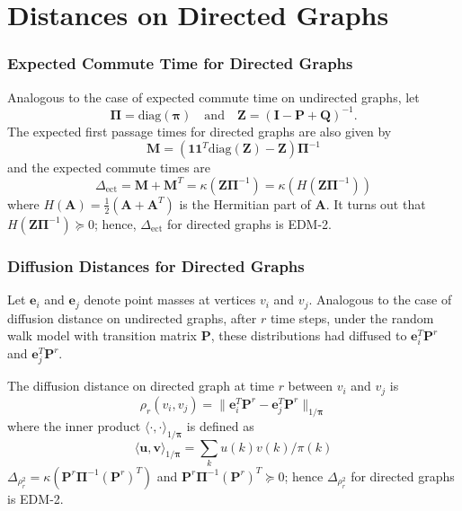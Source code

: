 \documentclass[professionalfonts, hyperref={pdfpagelabels=false,
  colorlinks=true, linkcolor=purple}]{beamer}
\begin{document}
\section{Distances on Directed Graphs}
\begin{frame}
  \frametitle{Expected Commute Time for Directed Graphs}
  Analogous to the case of expected commute time on undirected graphs,
  let 
  \begin{equation*}
    \bm{\Pi} = \mathrm{diag}(\bm{\pi}) \quad \text{and} \quad
    \mathbf{Z} = (\mathbf{I} - \mathbf{P} + \mathbf{Q})^{-1}.
  \end{equation*}
  The expected first passage times for directed graphs are also given by
  \begin{equation*}
    \mathbf{M} = (\mathbf{1}\mathbf{1}^{T}\mathrm{diag}(\mathbf{Z}) -
    \mathbf{Z})\bm{\Pi}^{-1} 
  \end{equation*}
  and the expected commute times are
  \begin{equation*}
    \Delta_{\mathrm{ect}} = \mathbf{M} + \mathbf{M}^{T} =
    \kappa(\mathbf{Z}\bm{\Pi}^{-1}) =
    \kappa(H(\mathbf{Z}\bm{\Pi}^{-1}))
  \end{equation*}
  where $H(\mathbf{A}) = \tfrac{1}{2}(\mathbf{A} + \mathbf{A}^{T})$ is
  the Hermitian part of $\mathbf{A}$.
  \vskip10pt
  It turns out that $H(\mathbf{Z}\bm{\Pi}^{-1}) \succeq 0$; hence,
  \vskip10pt \alert{$\Delta_{\mathrm{ect}}$ for directed graphs is
    EDM-2.}
\end{frame}

\begin{frame}
  \frametitle{Diffusion Distances for Directed Graphs}
  Let $\bm{e}_i$ and $\bm{e}_j$ denote point masses at vertices $v_i$ and
  $v_j$. Analogous to the case of diffusion distance on undirected
  graphs, after $r$ time steps, under the random walk model with
  transition matrix $\mathbf{P}$, these distributions had diffused to
  $\bm{e}_i^{T} \mathbf{P}^{r}$ and $\bm{e}_j^{T}\mathbf{P}^{r}$. 
  
  \vskip10pt 
  The diffusion distance on directed graph at
  time $r$ between $v_i$ and $v_j$ is
  \begin{equation*}
    \rho_{r}(v_i,v_j) = \| \bm{e}_i^{T} \mathbf{P}^{r} -
    \bm{e}_j^{T}
    \mathbf{P}^{r} \|_{1/\bm{\pi}}
  \end{equation*}
  where the inner product $\langle \cdot, \cdot
  \rangle_{1/\bm{\pi}}$ is defined as
  \begin{equation*}
    \langle \bm{u}, \bm{v} \rangle_{1/\bm{\pi}} = \sum_{k} u(k)
    v(k)/\pi(k)
  \end{equation*}
  $\Delta_{\rho_{r}^{2}} =
  \kappa(\mathbf{P}^{r}\bm{\Pi}^{-1}(\mathbf{P}^{r})^{T})$ and
  $\mathbf{P}^{r}\bm{\Pi}^{-1}(\mathbf{P}^{r})^{T} \succeq 0$; hence
  \vskip10pt \alert{$\Delta_{\rho_{r}^{2}}$ for directed graphs is EDM-2.}
\end{frame}
\end{document}
